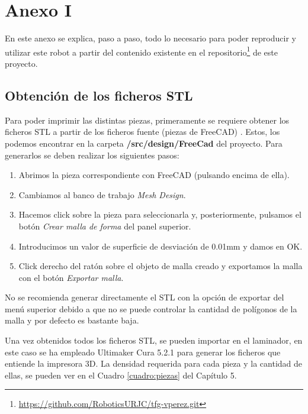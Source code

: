 \chapter*{Anexo I}
\label{cap:anexoi}

\noindent En este anexo se explica, paso a paso, todo lo necesario para poder reproducir y utilizar este robot a partir del contenido 
existente en el repositorio\footnote{\url{https://github.com/RoboticsURJC/tfg-vperez.git}} de este proyecto.

\section*{Obtención de los ficheros STL}
\noindent Para poder imprimir las distintas piezas, primeramente se requiere obtener los ficheros STL a partir de los ficheros fuente (piezas de FreeCAD) . 
Estos, los podemos encontrar en la carpeta \textbf{/src/design/FreeCad} del proyecto. Para generarlos se deben realizar los siguientes pasos:
\begin{enumerate}
\item Abrimos la pieza correspondiente con FreeCAD (pulsando encima de ella).
\item Cambiamos al banco de trabajo \textit{Mesh Design}.
\item Hacemos click sobre la pieza para seleccionarla y, posteriormente, pulsamos el botón \textit{Crear malla de forma} del panel superior.
\item Introducimos un valor de superficie de desviación de 0.01mm y damos en OK.
\item Click derecho del ratón sobre el objeto de malla creado y exportamos la malla con el botón \textit{Exportar malla}. 
\end{enumerate}

\begin{tcolorbox}[colback=blue!5!white,colframe=blue!75!black,title=Nota]
    No se recomienda generar directamente el STL con la opción de exportar del menú superior debido a que no se puede controlar la cantidad de polígonos 
    de la malla y por defecto es bastante baja.
\end{tcolorbox}

Una vez obtenidos todos los ficheros STL, se pueden importar en el laminador, en este caso se ha empleado 
Ultimaker Cura 5.2.1 para generar los ficheros que entiende la impresora 3D. La densidad requerida para cada pieza 
y la cantidad de ellas, se pueden ver en el Cuadro \ref{cuadro:piezas} del Capítulo 5.

